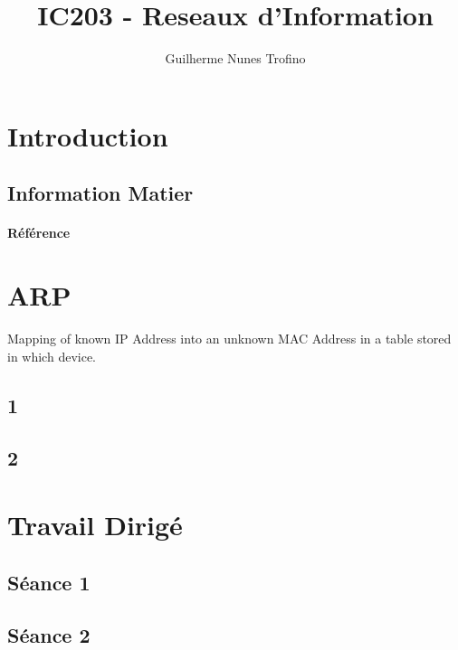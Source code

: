 \documentclass{article}
\title{IC203 - Reseaux d'Information}
\author{Guilherme Nunes Trofino}
\begin{document}
\maketitle


\newpage\tableofcontents

\section{Introduction}

% 
% 


\subsection{Information Matier}
\paragraph{Référence}

\section{ARP}
\begin{definition}
    Mapping of known IP Address into an unknown MAC Address in a table stored in which device.
\end{definition}


\subsection{1}

\subsection{2}

\section{Travail Dirigé}

\subsection{Séance 1}

\newpage\subsection{Séance 2}
\end{document}
